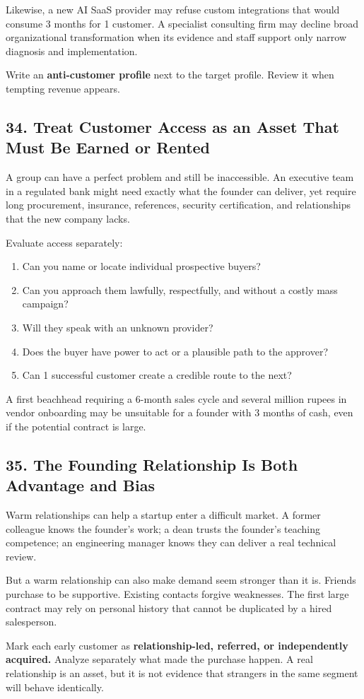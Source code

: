 Likewise, a new AI SaaS provider may refuse custom integrations that would consume 3 months for 1 customer. A specialist consulting firm may decline broad organizational transformation when its evidence and staff support only narrow diagnosis and implementation.

Write an \textbf{anti-customer profile} next to the target profile. Review it when tempting revenue appears.

\subsection*{34. Treat Customer Access as an Asset That Must Be Earned or Rented}

A group can have a perfect problem and still be inaccessible. An executive team in a regulated bank might need exactly what the founder can deliver, yet require long procurement, insurance, references, security certification, and relationships that the new company lacks.

Evaluate access separately:

\begin{enumerate}
    \item Can you name or locate individual prospective buyers?
    \item Can you approach them lawfully, respectfully, and without a costly mass campaign?
    \item Will they speak with an unknown provider?
    \item Does the buyer have power to act or a plausible path to the approver?
    \item Can 1 successful customer create a credible route to the next?
\end{enumerate}

A first beachhead requiring a 6-month sales cycle and several million rupees in vendor onboarding may be unsuitable for a founder with 3 months of cash, even if the potential contract is large.

\subsection*{35. The Founding Relationship Is Both Advantage and Bias}

Warm relationships can help a startup enter a difficult market. A former colleague knows the founder's work; a dean trusts the founder's teaching competence; an engineering manager knows they can deliver a real technical review.

But a warm relationship can also make demand seem stronger than it is. Friends purchase to be supportive. Existing contacts forgive weaknesses. The first large contract may rely on personal history that cannot be duplicated by a hired salesperson.

Mark each early customer as \textbf{relationship-led, referred, or independently acquired.} Analyze separately what made the purchase happen. A real relationship is an asset, but it is not evidence that strangers in the same segment will behave identically.
